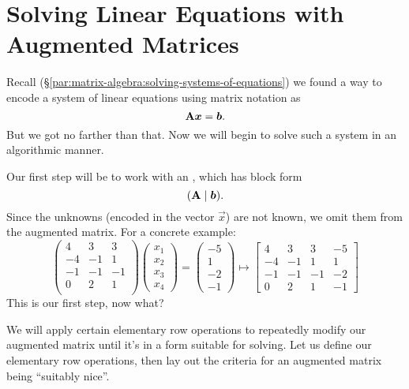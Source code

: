 \section{Solving Linear Equations with Augmented Matrices}

\M
Recall (\S\ref{par:matrix-algebra:solving-systems-of-equations})
we found a way to encode a system of linear equations using matrix
notation as
\begin{equation}
\mathbf{A}\boldsymbol{x}=\boldsymbol{b}.
\end{equation}
But we got no farther than that. Now we will begin to solve such a
system in an algorithmic manner.

Our first step will be to work with an , which
has block form
\begin{equation}
(\mathbf{A}\mid\boldsymbol{b}).
\end{equation}
Since the unknowns (encoded in the vector $\vec{x}$) are not known, we
omit them from the augmented matrix. For a concrete example:
\begin{equation}
  \begin{pmatrix}
  4 &  3 &  3\\
 -4 & -1 &  1\\
 -1 & -1 & -1\\
  0 &  2 &  1\\
  \end{pmatrix}\begin{pmatrix}x_{1}\\x_{2}\\x_{3}\\x_{4}
  \end{pmatrix} =
  \begin{pmatrix}-5\\1\\-2\\-1
  \end{pmatrix}
\mapsto
  \left[\begin{array}{ccc|c}
  4 &  3 &  3 & -5\\
 -4 & -1 &  1 &  1\\
 -1 & -1 & -1 & -2\\
  0 &  2 &  1 & -1 
  \end{array}\right]
\end{equation}
This is our first step, now what?

We will apply certain elementary row operations to repeatedly modify our
augmented matrix until it's in a form suitable for solving. Let us
define our elementary row operations, then lay out the criteria for an
augmented matrix being ``suitably nice''.

